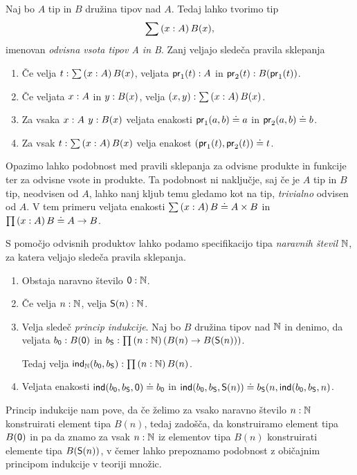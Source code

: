 \begin{definicija}
  Naj bo \(A\) tip in \(B\) družina tipov nad \(A\). Tedaj lahko tvorimo tip
  \[\sum \left( x : A \right) B(x),\] imenovan \emph{odvisna vsota tipov A in B}.
  Zanj veljajo sledeča pravila sklepanja
  \begin{enumerate}
  \item Če velja \(t : \sum \left( x : A \right) B(x)\), veljata
    \(\textnormal{\textsf{pr}}_{1}(t) : A\) in
    \(\textnormal{\textsf{pr}}_{2}(t) : B(\textnormal{\textsf{pr}}_{1}(t))\).
  \item Če veljata \(x : A\) in \(y : B(x)\), velja
    \((x, y) : \sum \left( x : A \right) B(x)\).
  \item Za vsaka \(x : A\) \(y : B(x)\) veljata enakosti
    \(\textnormal{\textsf{pr}}_{1}(a, b) \doteq a\) in \(\textnormal{\textsf{pr}}_{2}(a, b) \doteq b\).
  \item Za vsak \(t : \sum \left( x : A \right) B(x)\) velja enakost
    \((\textnormal{\textsf{pr}}_{1}(t), \textnormal{\textsf{pr}}_{2}(t)) \doteq t\).
  \end{enumerate}
\end{definicija}
Opazimo lahko podobnost med pravili sklepanja za odvisne produkte in
funkcije ter za odvisne vsote in produkte. Ta podobnost ni naključje, saj če
je \(A\) tip in \(B\) tip, neodvisen od \(A\), lahko nanj kljub temu gledamo kot na tip,
\emph{trivialno} odvisen od \(A\). V tem primeru veljata enakosti
\(\sum \left( x : A \right) B \doteq A \times B\) in \(\prod \left( x : A \right) B \doteq A \to B\).
\pagebreak

\begin{primer}
  S pomočjo odvisnih produktov lahko podamo specifikacijo tipa
  \emph{naravnih števil} \(\mathbb N\), za katera veljajo sledeča pravila sklepanja.
  \begin{enumerate}
  \item Obstaja naravno število \(\textnormal{\textsf{0}} : \mathbb N\).
  \item Če velja \(n : \mathbb N\),
    velja \(\textnormal{\textsf{S}}(n) : \mathbb N\).
  \item Velja sledeč \emph{princip indukcije}. Naj bo \(B\) družina tipov nad \(\mathbb N\) in
    denimo, da veljata \(b_{\textnormal{\textsf{0}}} : B(\textnormal{\textsf{0}})\) in
    \(b_{\textnormal{\textsf{S}}} : \prod \left( n : \mathbb N \right) (B(n) \to B(\textnormal{\textsf{S}}(n)))\).

    Tedaj velja
    \(\textnormal{\textsf{ind}}_{\mathbb N}(b_{\textnormal{\textsf{0}}}, b_{\textnormal{\textsf{S}}}) : \prod \left( n : \mathbb N \right) B(n)\).
  \item Veljata enakosti
    \(\textnormal{\textsf{ind}}(b_{\textnormal{\textsf{0}}}, b_{\textnormal{\textsf{S}}}, \textnormal{\textsf{0}}) \doteq b_{\textnormal{\textsf{0}}}\) in
    \(\textnormal{\textsf{ind}}(b_{\textnormal{\textsf{0}}}, b_{\textnormal{\textsf{S}}}, \textnormal{\textsf{S}}(n)) \doteq
      b_{\textnormal{\textsf{S}}}(n, \textnormal{\textsf{ind}}(b_{\textnormal{\textsf{0}}}, b_{\textnormal{\textsf{S}}}, n)\).
  \end{enumerate}
  Princip indukcije nam pove, da če želimo za vsako naravno število \(n : \mathbb N\)
  konstruirati element tipa \(B(n)\), tedaj zadošča, da konstruiramo element tipa \(B(\textnormal{\textsf{0}})\)
  in pa da znamo za vsak \(n : \mathbb N\) iz elementov tipa \(B(n)\) konstruirati elemente
  tipa \(B(\textnormal{\textsf{S}}(n))\), v čemer lahko prepoznamo podobnost z običajnim principom indukcije v
  teoriji množic.
\end{primer}

